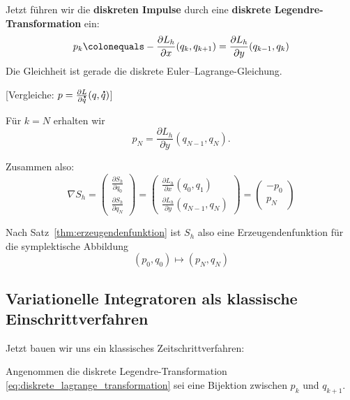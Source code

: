 \documentclass[german]{scrreprt}
\theoremstyle{plain}
\theoremstyle{nonumberplain}
\theoremstyle{nonumberplain}
\theoremstyle{nonumberplain}
\renewcommand*{\dot}[1]{\accentset{\mbox{\large\bfseries .}}{#1}}
\begin{document}
Jetzt führen wir die \textbf{diskreten Impulse} durch eine \textbf{diskrete Legendre-Transformation} ein:
\begin{equation}
\label{eq:diskrete_lagrange_transformation}
p_k
\colonequals
- \frac{\partial L_h}{\partial x} (q_k, q_{k+1})
= \frac{\partial L_h}{\partial y} (q_{k-1}, q_k)
\end{equation}
Die Gleichheit ist gerade die diskrete Euler--Lagrange-Gleichung.

[Vergleiche: $p = \frac{\partial L}{\partial \dot{q}}(q,\dot{q})$]

Für $k=N$ erhalten wir
\begin{equation*}
p_N = \frac{\partial L_h}{\partial y} (q_{N-1}, q_N).
\end{equation*}

Zusammen also:
\begin{equation*}
\nabla S_h = \begin{pmatrix}
\frac{\partial S_h}{\partial q_0} \\
\frac{\partial S_h}{\partial q_N}
\end{pmatrix} 
=
\begin{pmatrix}
\frac{\partial L_h}{\partial x} (q_0, q_1) \\
\frac{\partial L_h}{\partial y} (q_{N-1},q_N)
\end{pmatrix}
=
\begin{pmatrix}
- p_0 \\ p_N
\end{pmatrix}
\end{equation*}

Nach Satz~\ref{thm:erzeugendenfunktion} ist $S_h$ also eine Erzeugendenfunktion für die symplektische Abbildung
\begin{equation*}
(p_0, q_0) \mapsto (p_N, q_N)
\end{equation*} 



\subsection{Variationelle Integratoren als klassische Einschrittverfahren}

Jetzt bauen wir uns ein klassisches Zeitschrittverfahren:

Angenommen die diskrete Legendre-Transformation \eqref{eq:diskrete_lagrange_transformation} sei eine Bijektion zwischen $p_k$ und $q_{k+1}$.
\end{document}
